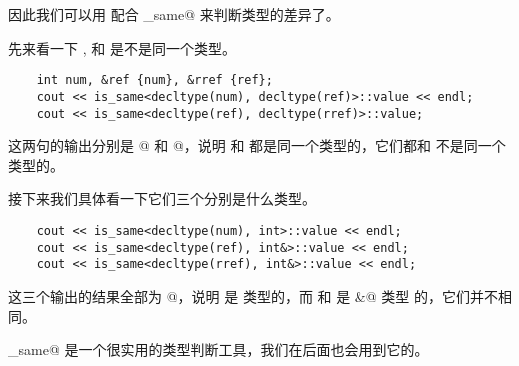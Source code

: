 因此我们可以用 \lstinline@decltype@ 配合 \lstinline@is_same@ 来判断类型的差异了。\par
先来看一下 \lstinline@num@, \lstinline@ref@ 和 \lstinline@rref@ 是不是同一个类型。
\begin{lstlisting}
    int num, &ref {num}, &rref {ref};
    cout << is_same<decltype(num), decltype(ref)>::value << endl;
    cout << is_same<decltype(ref), decltype(rref)>::value;
\end{lstlisting}
这两句的输出分别是 @ 和 @，说明 \lstinline@ref@ 和 \lstinline@rref@ 都是同一个类型的，它们都和 \lstinline@num@ 不是同一个类型的。\par
接下来我们具体看一下它们三个分别是什么类型。
\begin{lstlisting}
    cout << is_same<decltype(num), int>::value << endl;
    cout << is_same<decltype(ref), int&>::value << endl;
    cout << is_same<decltype(rref), int&>::value << endl;
\end{lstlisting}
这三个输出的结果全部为 @，说明 \lstinline@num@ 是 \lstinline@int@ 类型的，而 \lstinline@ref@ 和 \lstinline@rref@ 是 \lstinline@int&@ 类型 的，它们并不相同。\par
\lstinline@is_same@ 是一个很实用的类型判断工具，我们在后面也会用到它的。\par
